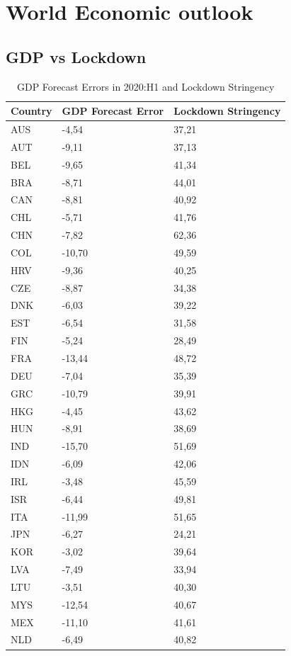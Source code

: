 \documentclass{SelfArx}
\begin{document}
\section*{World Economic outlook}
\label{sec:org1e6ad3f}


\subsection*{GDP vs Lockdown}
\label{sec:org5938bf6}
\begin{table}[htbp]
\caption{\label{IMF_fig_1}GDP Forecast Errors in 2020:H1 and Lockdown Stringency}
\centering
\begin{tabular}{lll}
\hline
Country & GDP Forecast Error & Lockdown Stringency\\
\hline
AUS & -4,54 & 37,21\\
AUT & -9,11 & 37,13\\
BEL & -9,65 & 41,34\\
BRA & -8,71 & 44,01\\
CAN & -8,81 & 40,92\\
CHL & -5,71 & 41,76\\
CHN & -7,82 & 62,36\\
COL & -10,70 & 49,59\\
HRV & -9,36 & 40,25\\
CZE & -8,87 & 34,38\\
DNK & -6,03 & 39,22\\
EST & -6,54 & 31,58\\
FIN & -5,24 & 28,49\\
FRA & -13,44 & 48,72\\
DEU & -7,04 & 35,39\\
GRC & -10,79 & 39,91\\
HKG & -4,45 & 43,62\\
HUN & -8,91 & 38,69\\
IND & -15,70 & 51,69\\
IDN & -6,09 & 42,06\\
IRL & -3,48 & 45,59\\
ISR & -6,44 & 49,81\\
ITA & -11,99 & 51,65\\
JPN & -6,27 & 24,21\\
KOR & -3,02 & 39,64\\
LVA & -7,49 & 33,94\\
LTU & -3,51 & 40,30\\
MYS & -12,54 & 40,67\\
MEX & -11,10 & 41,61\\
NLD & -6,49 & 40,82\\

\end{tabular}
\end{table}
\end{document}
